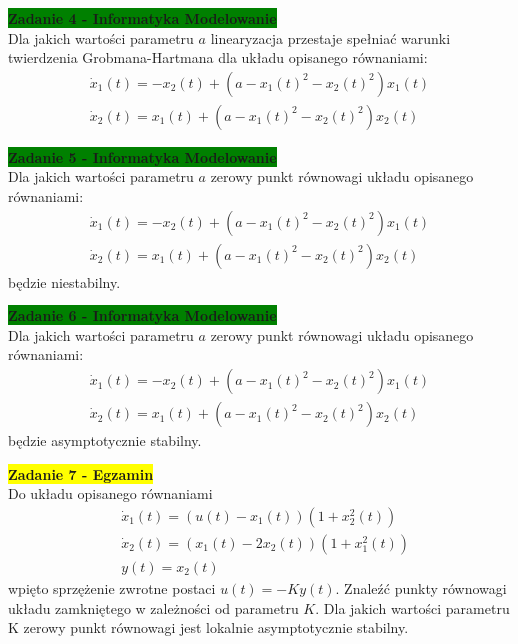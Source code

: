 \documentclass[a4paper,11pt]{article}
\begin{document}
\begin{framed}
\textbf{\colorbox{green}{Zadanie 4 - Informatyka Modelowanie} } \\ 
Dla jakich wartości parametru \( a \) linearyzacja przestaje spełniać warunki twierdzenia Grobmana-Hartmana dla układu opisanego równaniami:
\begin{align*}
\dot{x}_{1}(t)=-x_{2}(t)+(a-x_{1}(t)^{2}-x_{2}(t)^{2})x_{1}(t) \\
\dot{x}_{2}(t)=x_{1}(t)+(a-x_{1}(t)^{2}-x_{2}(t)^{2})x_{2}(t)
\end{align*}
\end{framed}

\newpage
\begin{framed}
\textbf{\colorbox{green}{Zadanie 5 - Informatyka Modelowanie} } \\ 
Dla jakich wartości parametru \( a \) zerowy punkt równowagi układu opisanego równaniami:
\begin{align*}
\dot{x}_{1}(t)=-x_{2}(t)+(a-x_{1}(t)^{2}-x_{2}(t)^{2})x_{1}(t) \\
\dot{x}_{2}(t)=x_{1}(t)+(a-x_{1}(t)^{2}-x_{2}(t)^{2})x_{2}(t)
\end{align*}
będzie niestabilny.
\end{framed}

\begin{framed}
\textbf{\colorbox{green}{Zadanie 6 - Informatyka Modelowanie} } \\ 
Dla jakich wartości parametru \( a \) zerowy punkt równowagi układu opisanego równaniami:
\begin{align*}
\dot{x}_{1}(t)=-x_{2}(t)+(a-x_{1}(t)^{2}-x_{2}(t)^{2})x_{1}(t) \\
\dot{x}_{2}(t)=x_{1}(t)+(a-x_{1}(t)^{2}-x_{2}(t)^{2})x_{2}(t)
\end{align*}
będzie asymptotycznie stabilny.
\end{framed}


\begin{framed}
\textbf{\colorbox{yellow}{Zadanie 7 - Egzamin}} \\ 
Do układu opisanego równaniami
\begin{align*}
&\dot{x}_{1}(t)= (u(t)-x_1(t))(1+x_2^2(t)) \\
&\dot{x}_{2}(t)= (x_1(t)-2x_2(t))(1+x_1^2(t)) \\
&y(t)=x_2(t)
\end{align*}
wpięto sprzężenie zwrotne postaci \( u(t)=-Ky(t) \). Znaleźć punkty równowagi układu zamkniętego w zależności od parametru \( K \). Dla jakich wartości parametru K zerowy punkt równowagi jest lokalnie asymptotycznie stabilny. 
\end{framed}
\end{document}

